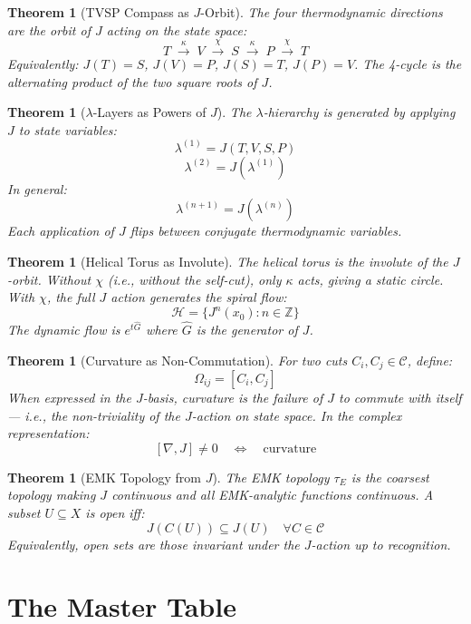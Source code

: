 \documentclass[12pt]{article}
\newtheorem{theorem}[axiom]{Theorem}
\begin{document}
\begin{theorem}[TVSP Compass as \(J\)-Orbit]
The four thermodynamic directions are the orbit of \(J\) acting on the state space:
\[
T \;\xrightarrow{\kappa}\; V \;\xrightarrow{\chi}\; S \;\xrightarrow{\kappa}\; P \;\xrightarrow{\chi}\; T
\]
Equivalently: \(J(T) = S\), \(J(V) = P\), \(J(S) = T\), \(J(P) = V\).
The 4-cycle is the alternating product of the two square roots of \(J\).
\end{theorem}

\begin{theorem}[\(\lambda\)-Layers as Powers of \(J\)]
The \(\lambda\)-hierarchy is generated by applying \(J\) to state variables:
\[
\lambda^{(1)} = J(T,V,S,P)
\]
\[
\lambda^{(2)} = J(\lambda^{(1)})
\]
In general:
\[
\lambda^{(n+1)} = J(\lambda^{(n)})
\]
Each application of \(J\) flips between conjugate thermodynamic variables.
\end{theorem}

\begin{theorem}[Helical Torus as Involute]
The helical torus is the involute of the \(J\)-orbit. Without \(\chi\) (i.e., without the self-cut), only \(\kappa\) acts, giving a static circle. With \(\chi\), the full \(J\) action generates the spiral flow:
\[
\mathcal{H} = \{ J^n(x_0) : n \in \mathbb{Z} \}
\]
The dynamic flow is \(e^{t\hat{G}}\) where \(\hat{G}\) is the generator of \(J\).
\end{theorem}

\begin{theorem}[Curvature as Non-Commutation]
For two cuts \(C_i, C_j \in \mathcal{C}\), define:
\[
\Omega_{ij} = [C_i, C_j]
\]
When expressed in the \(J\)-basis, curvature is the failure of \(J\) to commute with itself — i.e., the non-triviality of the \(J\)-action on state space. In the complex representation:
\[
[\nabla, J] \neq 0 \quad \Longleftrightarrow \quad \text{curvature}
\]
\end{theorem}

\begin{theorem}[EMK Topology from \(J\)]
The EMK topology \(\tau_E\) is the coarsest topology making \(J\) continuous and all EMK-analytic functions continuous. A subset \(U \subseteq X\) is open iff:
\[
J(C(U)) \subseteq J(U) \quad \forall C \in \mathcal{C}
\]
Equivalently, open sets are those invariant under the \(J\)-action up to recognition.
\end{theorem}

\section{The Master Table}
\end{document}
